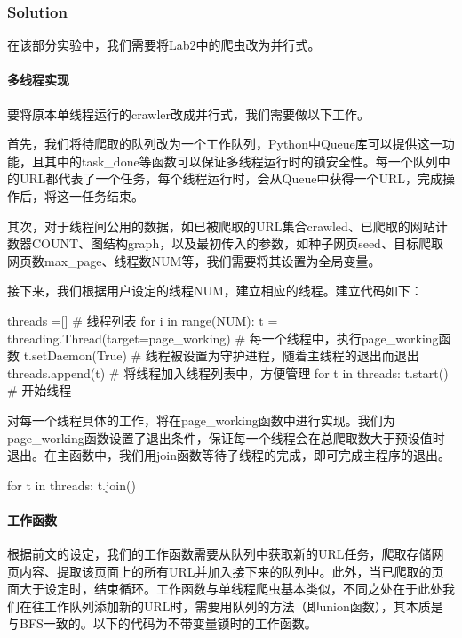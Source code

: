 \documentclass{article}
\begin{document}
\subsubsection{Solution}

在该部分实验中，我们需要将Lab2中的爬虫改为并行式。

\paragraph{多线程实现}
要将原本单线程运行的crawler改成并行式，我们需要做以下工作。

首先，我们将待爬取的队列改为一个工作队列，Python中Queue库可以提供这一功能，且其中的task\_done等函数可以保证多线程运行时的锁安全性。每一个队列中的URL都代表了一个任务，每个线程运行时，会从Queue中获得一个URL，完成操作后，将这一任务结束。

其次，对于线程间公用的数据，如已被爬取的URL集合crawled、已爬取的网站计数器COUNT、图结构graph，以及最初传入的参数，如种子网页seed、目标爬取网页数max\_page、线程数NUM等，我们需要将其设置为全局变量。

接下来，我们根据用户设定的线程NUM，建立相应的线程。建立代码如下：

\begin{python}
threads =[]                   # 线程列表
for i in range(NUM):
    t = threading.Thread(target=page_working)
                              # 每一个线程中，执行page_working函数
    t.setDaemon(True)         # 线程被设置为守护进程，随着主线程的退出而退出
    threads.append(t)         # 将线程加入线程列表中，方便管理
for t in threads:
    t.start()                 # 开始线程
\end{python}

对每一个线程具体的工作，将在page\_working函数中进行实现。我们为page\_working函数设置了退出条件，保证每一个线程会在总爬取数大于预设值时退出。在主函数中，我们用join函数等待子线程的完成，即可完成主程序的退出。

\begin{python}
for t in threads:
    t.join()
\end{python}

\paragraph{工作函数}
根据前文的设定，我们的工作函数需要从队列中获取新的URL任务，爬取存储网页内容、提取该页面上的所有URL并加入接下来的队列中。此外，当已爬取的页面大于设定时，结束循环。工作函数与单线程爬虫基本类似，不同之处在于此处我们在往工作队列添加新的URL时，需要用队列的方法（即union函数），其本质是与BFS一致的。以下的代码为不带变量锁时的工作函数。
\end{document}
